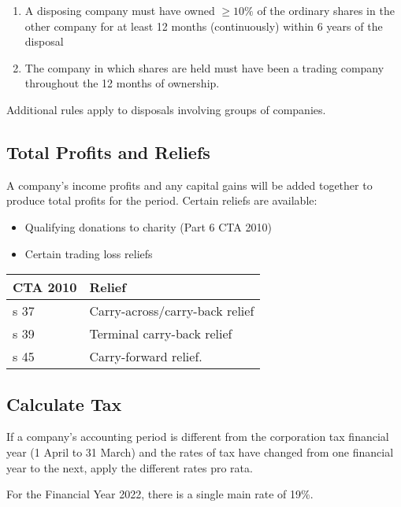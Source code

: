 \documentclass[
]{article}
\providecommand{\tightlist}{%
  \setlength{\itemsep}{0pt}\setlength{\parskip}{0pt}}
\begin{document}
\begin{enumerate}
\def\labelenumi{\arabic{enumi}.}
\tightlist
\item
  A disposing company must have owned \(\geq 10\%\) of the ordinary
  shares in the other company for at least 12 months (continuously)
  within 6 years of the disposal
\item
  The company in which shares are held must have been a trading company
  throughout the 12 months of ownership.
\end{enumerate}

Additional rules apply to disposals involving groups of companies.

\hypertarget{total-profits-and-reliefs}{%
\subsection{Total Profits and Reliefs}\label{total-profits-and-reliefs}}

A company's income profits and any capital gains will be added together
to produce total profits for the period. Certain reliefs are available:

\begin{itemize}
\tightlist
\item
  Qualifying donations to charity (Part 6 CTA 2010)
\item
  Certain trading loss reliefs
\end{itemize}

\begin{longtable}[]{@{}ll@{}}
\toprule()
CTA 2010 & Relief \\
\midrule()
\endhead
s 37 & Carry-across/carry-back relief \\
s 39 & Terminal carry-back relief \\
s 45 & Carry-forward relief. \\
\bottomrule()
\end{longtable}

\hypertarget{calculate-tax}{%
\subsection{Calculate Tax}\label{calculate-tax}}

If a company's accounting period is different from the corporation tax
financial year (1 April to 31 March) and the rates of tax have changed
from one financial year to the next, apply the different rates pro rata.

For the Financial Year 2022, there is a single main rate of 19\%.
\end{document}
